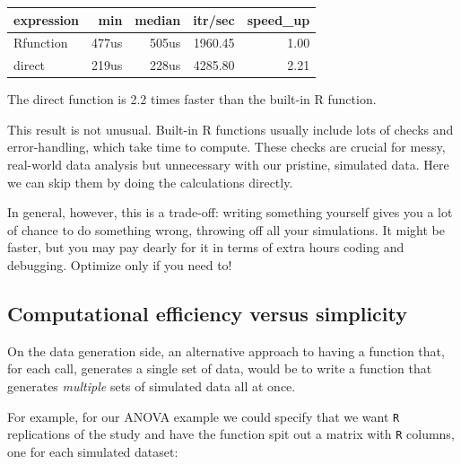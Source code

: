 \documentclass[
]{book}
\begin{document}
\begin{tabular}{l|r|r|r|r}
\hline
expression & min & median & itr/sec & speed\_up\\
\hline
Rfunction & 477us & 505us & 1960.45 & 1.00\\
\hline
direct & 219us & 228us & 4285.80 & 2.21\\
\hline
\end{tabular}

The direct function is 2.2 times faster than the built-in R function.

This result is not unusual.
Built-in R functions usually include lots of checks and error-handling, which take time to compute. These checks are crucial for messy, real-world data analysis but unnecessary with our pristine, simulated data.
Here we can skip them by doing the calculations directly.

In general, however, this is a trade-off: writing something yourself gives you a lot of chance to do something wrong, throwing off all your simulations.
It might be faster, but you may pay dearly for it in terms of extra hours coding and debugging.
Optimize only if you need to!

\subsection{Computational efficiency versus simplicity}\label{sec_comp_efficiency}

On the data generation side, an alternative approach to having a function that, for each call, generates a single set of data, would be to write a function that generates \emph{multiple} sets of simulated data all at once.

For example, for our ANOVA example we could specify that we want \texttt{R} replications of the study and have the function spit out a matrix with \texttt{R} columns, one for each simulated dataset:
\end{document}
